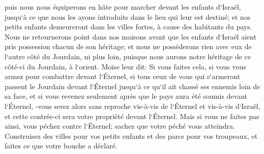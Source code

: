 \verse puis nous nous équiperons en hâte pour marcher devant les enfants d`Israël, jusqu`à ce que nous les ayons introduits dans le lieu qui leur est destiné; et nos petits enfants demeureront dans les villes fortes, à cause des habitants du pays. 
\verse Nous ne retournerons point dans nos maisons avant que les enfants d`Israël aient pris possession chacun de son héritage; 
\verse et nous ne posséderons rien avec eux de l`autre côté du Jourdain, ni plus loin, puisque nous aurons notre héritage de ce côté-ci du Jourdain, à l`orient. 
\verse Moïse leur dit: Si vous faites cela, si vous vous armez pour combattre devant l`Éternel, 
\verse si tous ceux de vous qui s`armeront passent le Jourdain devant l`Éternel jusqu`à ce qu`il ait chassé ses ennemis loin de sa face, 
\verse et si vous revenez seulement après que le pays aura été soumis devant l`Éternel, -vous serez alors sans reproche vis-à-vis de l`Éternel et vis-à-vis d`Israël, et cette contrée-ci sera votre propriété devant l`Éternel. 
\verse Mais si vous ne faites pas ainsi, vous péchez contre l`Éternel; sachez que votre péché vous atteindra. 
\verse Construisez des villes pour vos petits enfants et des parcs pour vos troupeaux, et faites ce que votre bouche a déclaré. 
